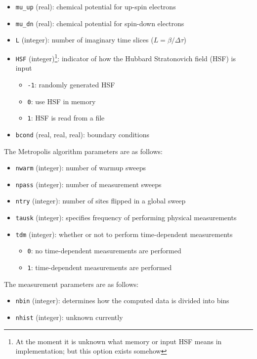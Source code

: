 \documentclass[12pt]{article}
\begin{document}
        \begin{itemize}
            \item \texttt{mu\_up} (real): chemical potential for up-spin electrons
            \item \texttt{mu\_dn} (real): chemical potential for spin-down electrons
            \item \texttt{L} (integer): number of imaginary time slices ($L=\beta/\Delta\tau$)
            \item \texttt{HSF} (integer)\footnote{At the moment it is unknown what memory or input HSF means in implementation; but this option exists somehow}: indicator of how the Hubbard Stratonovich field (HSF) is input 
            \begin{itemize}
                \item \texttt{-1}: randomly generated HSF
                \item \texttt{0}: use HSF in memory
                \item \texttt{1}: HSF is read from a file
            \end{itemize}
            \item \texttt{bcond} (real, real, real): boundary conditions
        \end{itemize}
        The Metropolis algorithm parameters are as follows:
        \begin{itemize}
            \item \texttt{nwarm} (integer): number of warmup sweeps
            \item \texttt{npass} (integer): number of measurement sweeps
            \item \texttt{ntry} (integer): number of sites flipped in a global sweep
            \item \texttt{tausk} (integer): specifies frequency of performing physical measurements
            \item \texttt{tdm} (integer): whether or not to perform time-dependent measurements
            \begin{itemize}
                \item \texttt{0}: no time-dependent measurements are performed
                \item \texttt{1}: time-dependent measurements are performed
            \end{itemize}
        \end{itemize}
        The measurement parameters are as follows:
        \begin{itemize}
            \item \texttt{nbin} (integer): determines how the computed data is divided into bins
            \item \texttt{nhist} (integer): unknown currently
        \end{itemize}
\end{document}
